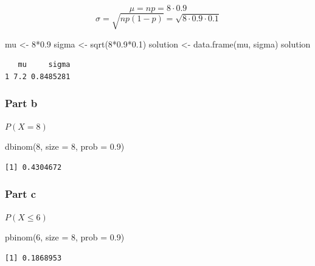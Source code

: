 \documentclass[
  letterpaper,
  DIV=11,
  numbers=noendperiod]{scrartcl}
\newenvironment{Shaded}{\begin{snugshade}}{\end{snugshade}}
\newcommand{\AttributeTok}[1]{\textcolor[rgb]{0.40,0.45,0.13}{#1}}
\newcommand{\DecValTok}[1]{\textcolor[rgb]{0.68,0.00,0.00}{#1}}
\newcommand{\FloatTok}[1]{\textcolor[rgb]{0.68,0.00,0.00}{#1}}
\newcommand{\FunctionTok}[1]{\textcolor[rgb]{0.28,0.35,0.67}{#1}}
\newcommand{\NormalTok}[1]{\textcolor[rgb]{0.00,0.23,0.31}{#1}}
\newcommand{\OtherTok}[1]{\textcolor[rgb]{0.00,0.23,0.31}{#1}}
\newcommand{\SpecialCharTok}[1]{\textcolor[rgb]{0.37,0.37,0.37}{#1}}
\begin{document}
\[\mu = np = 8 \cdot 0.9\]
\[\sigma = \sqrt{np(1-p)} = \sqrt{8 \cdot 0.9 \cdot 0.1}\]

\begin{Shaded}
\begin{Highlighting}[]
\NormalTok{mu }\OtherTok{\textless{}{-}} \DecValTok{8}\SpecialCharTok{*}\FloatTok{0.9}
\NormalTok{sigma }\OtherTok{\textless{}{-}} \FunctionTok{sqrt}\NormalTok{(}\DecValTok{8}\SpecialCharTok{*}\FloatTok{0.9}\SpecialCharTok{*}\FloatTok{0.1}\NormalTok{)}
\NormalTok{solution }\OtherTok{\textless{}{-}} \FunctionTok{data.frame}\NormalTok{(mu, sigma)}
\NormalTok{solution}
\end{Highlighting}
\end{Shaded}

\begin{verbatim}
   mu     sigma
1 7.2 0.8485281
\end{verbatim}

\subsubsection{Part b}\label{part-b}

\(P(X = 8)\)

\begin{Shaded}
\begin{Highlighting}[]
\FunctionTok{dbinom}\NormalTok{(}\DecValTok{8}\NormalTok{, }\AttributeTok{size =} \DecValTok{8}\NormalTok{, }\AttributeTok{prob =} \FloatTok{0.9}\NormalTok{)}
\end{Highlighting}
\end{Shaded}

\begin{verbatim}
[1] 0.4304672
\end{verbatim}

\subsubsection{Part c}\label{part-c}

\(P(X \leq 6)\)

\begin{Shaded}
\begin{Highlighting}[]
\FunctionTok{pbinom}\NormalTok{(}\DecValTok{6}\NormalTok{, }\AttributeTok{size =} \DecValTok{8}\NormalTok{, }\AttributeTok{prob =} \FloatTok{0.9}\NormalTok{)}
\end{Highlighting}
\end{Shaded}

\begin{verbatim}
[1] 0.1868953
\end{verbatim}
\end{document}
